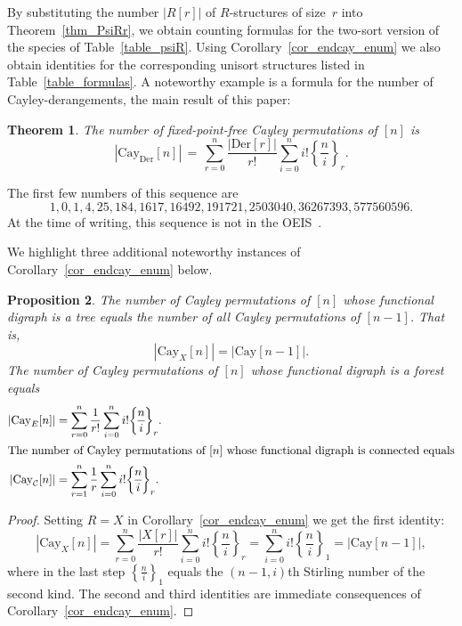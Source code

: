 \documentclass[a4paper,11pt,UKenglish]{article}
\newcommand{\Set}{E}
\newcommand{\Cyc}{\mathcal{C}}
\newcommand{\Der}{\mathrm{Der}}
\newcommand{\Cay}{\mathrm{Cay}}
\newcommand{\sdiff}[3]{\genfrac{\{}{\}}{}{}{{#1}}{{#2}}_{{#3}}}
\newcommand{\todo}{\texttt{TODO}}
\newtheorem{theorem}{Theorem}[section]
\newtheorem{proposition}[theorem]{Proposition}
\theoremstyle{definition}
\begin{document}

By substituting the number $|R[r]|$ of $R$-structures of size~$r$ into
Theorem~\ref{thm_PsiRr}, we obtain counting formulas for
the two-sort version of the species of Table~\ref{table_psiR}.
Using Corollary~\ref{cor_endcay_enum}
we also obtain identities for the corresponding unisort structures
listed in Table~\ref{table_formulas}. A noteworthy example is a
formula for the number of Cayley-derangements, the main result
of this paper:
\begin{theorem}\label{thm_eq_cayder}
  The number of fixed-point-free Cayley permutations of $[n]$ is
  \begin{equation*}
    |\Cay_{\Der}[n]|
    \,=\, \sum_{r=0}^n\frac{|\Der[r]|}{r!}\sum_{i=0}^ni!\sdiff{n}{i}{r}.
  \end{equation*}
\end{theorem}
The first few numbers of this sequence are
$$
1,
 0,
 1,
 4,
 25,
 184,
 1617,
 16492,
 191721,
 2503040,
 36267393,
 577560596.
$$
At the time of writing, this sequence is not in the OEIS~\cite{Sl}.


We highlight three additional noteworthy instances of
Corollary~\ref{cor_endcay_enum} below.

\begin{proposition}\label{prop_Cay_new}
  The number of Cayley permutations of $[n]$
  whose functional digraph is a tree equals the number of all
  Cayley permutations of $[n-1]$. That is,
  \[
    |\Cay_{X}[n]| = |\Cay[n-1]|.
  \]
  The number of Cayley permutations of $[n]$ whose functional digraph is
  a forest equals
  \begin{align*}
    |\Cay_E[n]| &= \sum_{r=0}^n\frac{1}{r!}\sum_{i=0}^ni!\sdiff{n}{i}{r}.\\
    \intertext{The number of Cayley permutations of $[n]$ whose functional
    digraph is connected equals}
    |\Cay_{\Cyc}[n]| &= \sum_{r=1}^n\frac{1}{r}\sum_{i=0}^ni!\sdiff{n}{i}{r}.
  \end{align*}
\end{proposition}
\begin{proof}
  Setting $R=X$ in Corollary~\ref{cor_endcay_enum} we get the first identity:
  \[
    |\Cay_{X}[n]|
    = \sum_{r=0}^n\frac{|X[r]|}{r!}\sum_{i=0}^ni!\sdiff{n}{i}{r}
    = \sum_{i=0}^ni!\sdiff{n}{i}{1}
    = |\Cay[n-1]|,
  \]
  where in the last step $\sdiff{n}{i}{1}$ equals the
  $(n-1,i)$th Stirling number of the second kind. The second and third
  identities are immediate consequences of Corollary~\ref{cor_endcay_enum}.
\end{proof}
\end{document}
